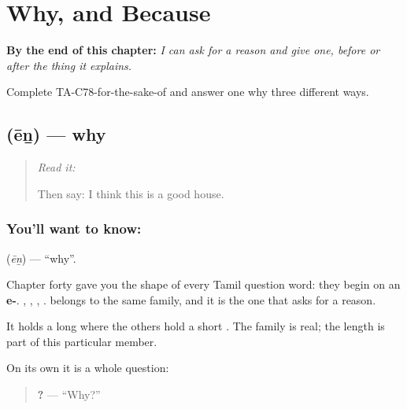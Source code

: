 
\chapter{Why, and Because}
\label{ch:ta-why-and-because}

\begin{chapteropening}
\textbf{By the end of this chapter:} \emph{I can ask for a reason and give one, before or after the thing it explains.}

Complete TA-C78-for-the-sake-of and answer one why three different ways.
\end{chapteropening}

\section[\texorpdfstring{\ta{ஏன்} (ēṉ)}{ஏன் (ēṉ)}]{ (ēṉ) — why}

\label{lesson:TA-C78-why}



\begin{quote}
\emph{Read it:} \textbf{}

Then say: I think this is a good house.
\end{quote}

\subsection*{You'll want to know: }
\textbf{} (\emph{ēṉ}) — \textquotedblleft{}why\textquotedblright{}.

Chapter forty gave you the shape of every Tamil question word: they begin on an \textbf{e-}. , , , .  belongs to the same family, and it is the one that asks for a reason.

It holds a long \textbf{} where the others hold a short \textbf{}. The family is real; the length is part of this particular member.

On its own it is a whole question:

\begin{quote}
\textbf{?} — \textquotedblleft{}Why?\textquotedblright{}
\end{quote}


